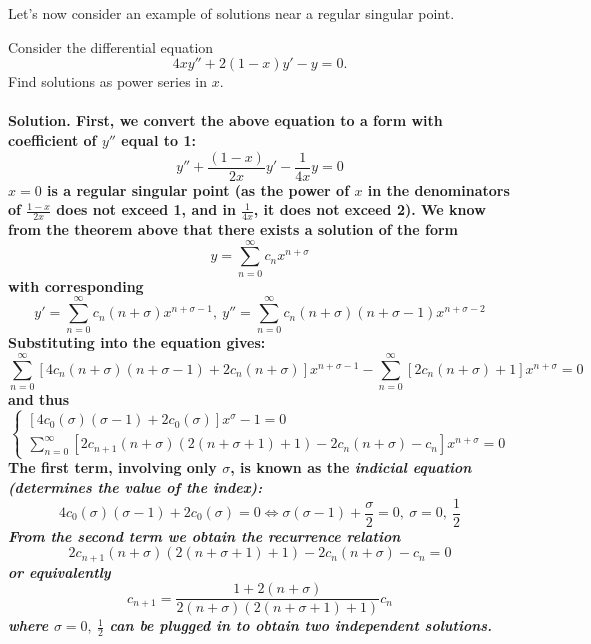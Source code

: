 \documentclass{article}
\begin{document}
\newpage
Let's now consider an example of solutions near a regular singular point.
\begin{example}
    Consider the differential equation 
    \begin{equation*}
        4xy''+2(1-x)y'-y=0.
    \end{equation*}
    Find solutions as power series in $x$. \\ \\
    \bf Solution. \normalfont First, we convert the above equation to a form with coefficient of $y''$ equal to 1:
    \begin{equation*}
        y''+\frac{(1-x)}{2x}y'-\frac{1}{4x}y = 0
    \end{equation*}
    $x=0$ is a regular singular point (as the power of $x$ in the denominators of $\frac{1-x}{2x}$ does not exceed 1, and in $\frac{1}{4x}$, it does not exceed 2). We know from the theorem above that there exists a solution of the form 
    \begin{equation*}
        y=\sum_{n=0}^{\infty}c_n x^{n+\sigma}
    \end{equation*}
    with corresponding 
    \begin{equation*}
        y'=\sum_{n=0}^{\infty}c_n(n+\sigma) x^{n+\sigma-1}, \ y'' =\sum_{n=0}^{\infty}c_n(n+\sigma)(n+\sigma -1)x^{n+\sigma-2}
    \end{equation*}
    Substituting into the equation gives:
    \begin{equation*}
        \sum_{n=0}^{\infty}[4c_n(n+\sigma)(n+\sigma-1)+2c_n(n+\sigma)]x^{n+\sigma-1} - \sum_{n=0}^{\infty}[2c_n(n+\sigma)+1]x^{n+\sigma} = 0
    \end{equation*}
    and thus 
    \begin{equation*}
        \begin{cases}
            [4c_0(\sigma)(\sigma-1)+2c_0(\sigma)]x^{\sigma}-1=0 \\
            \sum_{n=0}^{\infty}[2c_{n+1}(n+\sigma)(2(n+\sigma+1)+1)-2c_n(n+\sigma)-c_n]x^{n+\sigma} = 0
        \end{cases}
    \end{equation*}
    The first term, involving only $\sigma$, is known as the \it indicial equation \normalfont (determines the value of the index):
    \begin{equation*}
        4c_0(\sigma)(\sigma-1)+2c_0(\sigma) = 0 \iff \sigma(\sigma-1)+\frac{\sigma}{2}=0,\ \sigma=0,\ \frac{1}{2}
    \end{equation*}
    From the second term we obtain the recurrence relation
    \begin{equation*}
        2c_{n+1}(n+\sigma)(2(n+\sigma+1)+1)-2c_n(n+\sigma)-c_n=0
    \end{equation*}
    or equivalently
    \begin{equation*}
        c_{n+1}=\frac{1+2(n+\sigma)}{2(n+\sigma)(2(n+\sigma+1)+1)}c_n
    \end{equation*}
    where $\sigma = 0,\ \frac{1}{2}$ can be plugged in to obtain two independent solutions.
\end{example}
\newpage
\end{document}
